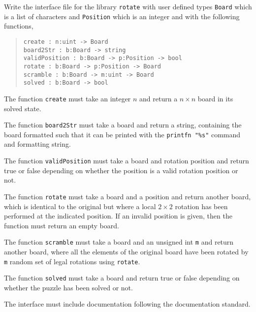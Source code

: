 Write the interface file for the library \lstinline{rotate} with user defined types \lstinline{Board} which is a list of characters and \lstinline{Position} which is an integer and with the following functions,
\begin{quote}
  \lstinline{create : n:uint -> Board}
  \\\lstinline{board2Str : b:Board -> string}
  \\\lstinline{validPosition : b:Board -> p:Position -> bool}
  \\\lstinline{rotate : b:Board -> p:Position -> Board}
  \\\lstinline{scramble : b:Board -> m:uint -> Board}
  \\\lstinline{solved : b:Board -> bool}
\end{quote}
The function \lstinline{create} must take an integer $n$ and return a $n\times n$ board in its solved state.

The function \lstinline{board2Str} must take a board and return a string, containing the board formatted such that it can be printed with the \lstinline{printfn "%s"} command and formatting string.

The function \lstinline{validPosition} must take a board and rotation position and return true or false depending on whether the position is a valid rotation position or not.

The function \lstinline{rotate} must take a board and a position and return another board, which is identical to the original but where a local $2\times 2$ rotation has been performed at the indicated position. If an invalid position is given, then the function must return an empty board.

The function \lstinline{scramble} must take a board and an unsigned int \lstinline{m} and return another board, where all the elements of the original board have been rotated by \lstinline{m} random set of legal rotations using \lstinline{rotate}.

The function \lstinline{solved} must take a board and return true or false depending on whether the puzzle has been solved or not.

The interface must include documentation following the documentation standard.
